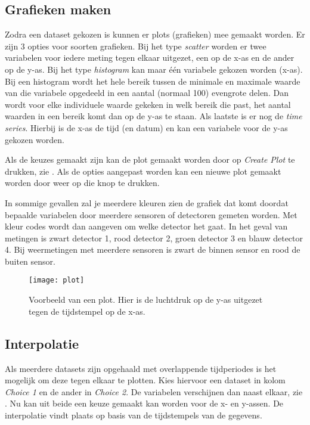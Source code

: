 \subsection{Grafieken maken}\label{subsec:plotting}

Zodra een dataset gekozen is kunnen er plots (grafieken) mee gemaakt
worden. Er zijn 3 opties voor soorten grafieken. Bij het type
\emph{scatter} worden er twee variabelen voor iedere meting tegen elkaar
uitgezet, een op de x-as en de ander op de y-as. Bij het type
\emph{histogram} kan maar één variabele gekozen worden (x-as). Bij een
histogram wordt het hele bereik tussen de minimale en maximale waarde
van die variabele opgedeeld in een aantal (normaal 100) evengrote delen.
Dan wordt voor elke individuele waarde gekeken in welk bereik die past,
het aantal waarden in een bereik komt dan op de y-as te staan. Als
laatste is er nog de \emph{time series}. Hierbij is de x-as de tijd (en
datum) en kan een variabele voor de y-as gekozen worden.

Als de keuzes gemaakt zijn kan de plot gemaakt worden door op
\emph{Create Plot} te drukken, zie . Als de opties
aangepast worden kan een nieuwe plot gemaakt worden door weer op die
knop te drukken.

In sommige gevallen zal je meerdere kleuren zien de grafiek dat komt
doordat bepaalde variabelen door meerdere sensoren of detectoren gemeten
worden. Met kleur codes wordt dan aangeven om welke detector het gaat.
In het geval van \hisparc metingen is zwart detector 1, rood detector 2,
groen detector 3 en blauw detector 4. Bij weermetingen met meerdere
sensoren is zwart de binnen sensor en rood de buiten sensor.

\begin{figure}
    \centering
    \texttt{[image: plot]}
    \caption{Voorbeeld van een plot. Hier is de luchtdruk op de y-as
             uitgezet tegen de tijdstempel op de x-as.}
    \label{fig:plot}
\end{figure}


\subsection{Interpolatie}

Als meerdere datasets zijn opgehaald met overlappende tijdperiodes is
het mogelijk om deze tegen elkaar te plotten. Kies hiervoor een dataset
in kolom \emph{Choice 1} en de ander in \emph{Choice 2}. De variabelen
verschijnen dan naast elkaar, zie . Nu kan uit
beide een keuze gemaakt kan worden voor de x- en y-assen. De
interpolatie vindt plaats op basis van de tijdstempels van de gegevens.

